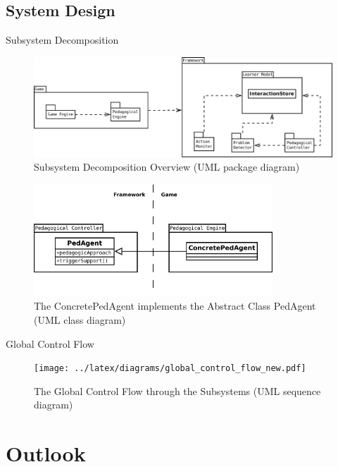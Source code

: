 \documentclass[compress]{beamer}
\begin{document}
\subsection{System Design}

\begin{frame}[allowframebreaks]{Subsystem Decomposition}
\begin{figure}
    \centering
    \includegraphics[width=\textwidth]{diagrams/subsystem_decomposition_new.pdf}
    \caption{Subsystem Decomposition Overview (UML package diagram)}
\end{figure}

\begin{figure}
    \centering
    \includegraphics[width=0.8\textwidth]{diagrams/pedagent_concrete.pdf}
    \caption{The ConcretePedAgent implements the Abstract Class PedAgent (UML class diagram)}
\end{figure}
\end{frame}

\begin{frame}{Global Control Flow}
\begin{figure}
    \centering
    \texttt{[image: ../latex/diagrams/global\_control\_flow\_new.pdf]}
    \caption{The Global Control Flow through the Subsystems (UML sequence diagram)}
\end{figure}
\end{frame}

\section{Outlook}
\end{document}
